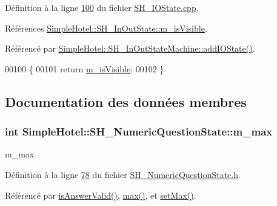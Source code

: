 Définition à la ligne \hyperlink{SH__IOState_8cpp_source_l00100}{100} du fichier \hyperlink{SH__IOState_8cpp_source}{S\-H\-\_\-\-I\-O\-State.\-cpp}.



Références \hyperlink{classSimpleHotel_1_1SH__InOutState_a041ad53f3cdfb1b18ee002597e833848}{Simple\-Hotel\-::\-S\-H\-\_\-\-In\-Out\-State\-::m\-\_\-is\-Visible}.



Référencé par \hyperlink{classSimpleHotel_1_1SH__InOutStateMachine_a07ae9f1f74a9a41b26e77a014679a33e}{Simple\-Hotel\-::\-S\-H\-\_\-\-In\-Out\-State\-Machine\-::add\-I\-O\-State()}.


\begin{DoxyCode}
00100                                \{
00101     \textcolor{keywordflow}{return} \hyperlink{classSimpleHotel_1_1SH__InOutState_a041ad53f3cdfb1b18ee002597e833848}{m\_isVisible};
00102 \}
\end{DoxyCode}


\subsection{Documentation des données membres}
\hypertarget{classSimpleHotel_1_1SH__NumericQuestionState_a91f7a59f3b71276a00286f617a3f30ff}{
\subsubsection[{m\-\_\-max}]{\setlength{\rightskip}{0pt plus 5cm}int Simple\-Hotel\-::\-S\-H\-\_\-\-Numeric\-Question\-State\-::m\-\_\-max\hspace{0.3cm}{\ttfamily [private]}}}\label{classSimpleHotel_1_1SH__NumericQuestionState_a91f7a59f3b71276a00286f617a3f30ff}


m\-\_\-max 



Définition à la ligne \hyperlink{SH__NumericQuestionState_8h_source_l00078}{78} du fichier \hyperlink{SH__NumericQuestionState_8h_source}{S\-H\-\_\-\-Numeric\-Question\-State.\-h}.



Référencé par \hyperlink{classSimpleHotel_1_1SH__NumericQuestionState_acfef357cecf511d31d2c992252b91c40}{is\-Answer\-Valid()}, \hyperlink{classSimpleHotel_1_1SH__NumericQuestionState_a52840eebf864939b1294ac6e7c41c64f}{max()}, et \hyperlink{classSimpleHotel_1_1SH__NumericQuestionState_a82351cd851dcd0972410a61b61ab7b18}{set\-Max()}.

